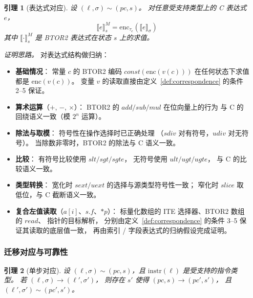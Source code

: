 \documentclass[11pt,a4paper]{article}
\newtheorem{lemma}{引理}[section]
\begin{document}
\begin{lemma}[表达式对应]
\label{lem:expr}
设 $(\ell, \sigma) \sim (\mathit{pc}, s)$。
对任意受支持类型上的 C 表达式 $e$，
\[
\llbracket e \rrbracket^{M}_s
= \mathrm{enc}_{\tau_e}\!\left(\llbracket e \rrbracket_\sigma\right)
\]
其中 $\llbracket \cdot \rrbracket^M_s$ 是 BTOR2 表达式在状态 $s$ 上的求值。
\end{lemma}

\noindent\textit{证明思路。}
对表达式结构做归纳：

\begin{itemize}
\item \textbf{基础情况}：
  常量 $c$ 的 BTOR2 编码 $\mathit{const}(\mathrm{enc}(v(c)))$
  在任何状态下求值都是 $\mathrm{enc}(v(c))$。
  变量 $v$ 的读取直接由定义~\ref{def:correspondence} 的条件 2--5 保证。

\item \textbf{算术运算}（$+$, $-$, $\times$）：
  BTOR2 的 $\mathit{add/sub/mul}$ 在位向量上的行为
  与 C 的回绕语义一致（模 $2^n$ 运算）。

\item \textbf{除法与取模}：
  符号性在操作选择时已正确处理
  （$\mathit{sdiv}$ 对有符号，$\mathit{udiv}$ 对无符号）。
  当除数非零时，BTOR2 的除法与 C 语义一致。

\item \textbf{比较}：
  有符号比较使用 $\mathit{slt/sgt/sgte}$，
  无符号使用 $\mathit{ult/ugt/ugte}$，
  与 C 的比较语义一致。

\item \textbf{类型转换}：
  宽化时 $\mathit{sext/uext}$ 的选择与源类型符号性一致；
  窄化时 $\mathit{slice}$ 取低位，与 C 截断语义一致。

\item \textbf{复合左值读取}（$a[i]$、$s.f$、$*p$）：
  标量化数组的 ITE 选择器、BTOR2 数组的 $\mathit{read}$、
  指针的目标解析，
  分别由定义~\ref{def:correspondence} 的条件 3--5 保证其读取的底层值一致，
  再由索引 / 字段表达式的归纳假设完成证明。
\end{itemize}

\subsubsection{迁移对应与可靠性}
\label{sec:simulation}

\begin{lemma}[单步对应]
\label{lem:step}
设 $(\ell, \sigma) \sim (\mathit{pc}, s)$，且 $\mathrm{instr}(\ell)$ 是受支持的指令类型。
若 $(\ell, \sigma) \to (\ell', \sigma')$，
则存在 $s'$ 使得 $(\mathit{pc}, s) \to (\mathit{pc}', s')$，
且 $(\ell', \sigma') \sim (\mathit{pc}', s')$。
\end{lemma}
\end{document}
